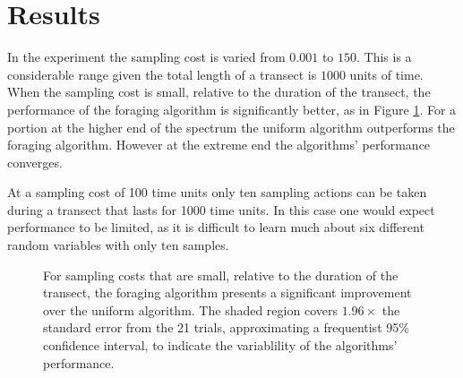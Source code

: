 \section{Results}
\label{sec:results}




% 

% 

In the experiment the sampling cost is varied from $0.001$ to $150$.  This is a considerable range given the total length of a transect is $1000$ units of time.  When the sampling cost is small, relative to the duration of the transect, the performance of the foraging algorithm is significantly better, as in Figure \ref{fig:err}.  For a portion at the higher end of the spectrum the uniform algorithm outperforms the foraging algorithm.  However at the extreme end the algorithms' performance converges.  

At a sampling cost of 100 time units only ten sampling actions can be taken during a transect that lasts for 1000 time units.  In this case one would expect performance to be limited, as it is difficult to learn much about six different random variables with only ten samples.  


\begin{figure}[htpd!]
	\centering
	\def\svgwidth{\columnwidth}
% 	
	
	\caption{For sampling costs that are small, relative to the duration of the transect, the foraging algorithm presents a significant improvement over the uniform algorithm.  The shaded region covers $1.96\times$ the standard error from the 21 trials, approximating a frequentist 95\% confidence interval, to indicate the variablility of the algorithms' performance.}
	\label{fig:err}
\end{figure}

